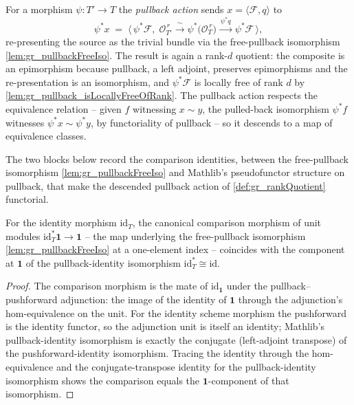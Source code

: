 \begin{definition}
  For a morphism \(\psi : T' \to T\) the \emph{pullback action} sends
  \(x = \langle \mathcal{F}, q\rangle\) to
  \[
    \psi^{*}x \;=\;
      \bigl\langle\, \psi^{*}\mathcal{F},\;
        \mathcal{O}_{T'}^{\,r} \xrightarrow{\ \sim\ }
        \psi^{*}\bigl(\mathcal{O}_T^{\,r}\bigr) \xrightarrow{\ \psi^{*}q\ }
        \psi^{*}\mathcal{F} \,\bigr\rangle,
  \]
  re-presenting the source as the trivial bundle via the free-pullback isomorphism
  \cref{lem:gr_pullbackFreeIso}. The result is again a rank-\(d\) quotient: the composite is
  an epimorphism because pullback, a left adjoint, preserves epimorphisms and the
  re-presentation is an isomorphism, and \(\psi^{*}\mathcal{F}\) is locally free of rank \(d\)
  by \cref{lem:gr_pullback_isLocallyFreeOfRank}. The pullback action respects the equivalence
  relation -- given \(f\) witnessing \(x \sim y\), the pulled-back isomorphism \(\psi^{*}f\)
  witnesses \(\psi^{*}x \sim \psi^{*}y\), by functoriality of pullback -- so it descends to a
  map of equivalence classes.
\end{definition}

The two blocks below record the comparison identities, between the free-pullback isomorphism
\cref{lem:gr_pullbackFreeIso} and Mathlib's pseudofunctor structure on pullback, that make
the descended pullback action of \cref{def:gr_rankQuotient} functorial.

\begin{lemma}
  \label{lem:gr_pullbackObjUnitToUnit_id}
  For the identity morphism \(\mathrm{id}_T\), the canonical comparison morphism of unit
  modules \(\mathrm{id}_T^{*}\mathbf{1} \to \mathbf{1}\) -- the map underlying the
  free-pullback isomorphism \cref{lem:gr_pullbackFreeIso} at a one-element index -- coincides
  with the component at \(\mathbf{1}\) of the pullback-identity isomorphism
  \(\mathrm{id}_T^{*} \cong \mathrm{id}\).
\end{lemma}

\begin{proof}
  \leanok
  The comparison morphism is the mate of \(\mathrm{id}_{\mathbf 1}\) under the
  pullback--pushforward adjunction: the image of the identity of \(\mathbf 1\) through the
  adjunction's hom-equivalence on the unit. For the identity scheme morphism the pushforward
  is the identity functor, so the adjunction unit is itself an identity; Mathlib's
  pullback-identity isomorphism is exactly the conjugate (left-adjoint transpose) of the
  pushforward-identity isomorphism. Tracing the identity through the hom-equivalence and the
  conjugate-transpose identity for the pullback-identity isomorphism shows the comparison
  equals the \(\mathbf 1\)-component of that isomorphism.
\end{proof}

